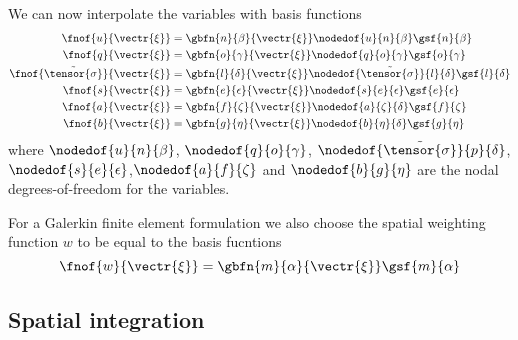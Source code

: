 We can now interpolate the variables with basis functions \ie
\begin{equation}
  \begin{split}
    \fnof{u}{\vectr{\xi}}&=\gbfn{n}{\beta}{\vectr{\xi}}\nodedof{u}{n}{\beta}\gsf{n}{\beta} \\
    \fnof{q}{\vectr{\xi}}&= \gbfn{o}{\gamma}{\vectr{\xi}}\nodedof{q}{o}{\gamma}\gsf{o}{\gamma} \\
    \fnof{\tilde{\tensor{\sigma}}}{\vectr{\xi}}&=
    \gbfn{l}{\delta}{\vectr{\xi}}\nodedof{\tilde{\tensor{\sigma}}}{l}{\delta}\gsf{l}{\delta} \\
    \fnof{s}{\vectr{\xi}}&=\gbfn{e}{\epsilon}{\vectr{\xi}}\nodedof{s}{e}{\epsilon}\gsf{e}{\epsilon} \\
    \fnof{a}{\vectr{\xi}}&=\gbfn{f}{\zeta}{\vectr{\xi}}\nodedof{a}{\zeta}{\delta}\gsf{f}{\zeta} \\
    \fnof{b}{\vectr{\xi}}&=\gbfn{g}{\eta}{\vectr{\xi}}\nodedof{b}{\eta}{\delta}\gsf{g}{\eta}
  \end{split}
\end{equation}
where $\nodedof{u}{n}{\beta}$, $\nodedof{q}{o}{\gamma}$,
$\nodedof{\tilde{\tensor{\sigma}}}{p}{\delta}$,$\nodedof{s}{e}{\epsilon}$,$\nodedof{a}{f}{\zeta}$
and $\nodedof{b}{g}{\eta}$ are the nodal degrees-of-freedom for the variables.

For a Galerkin finite element formulation we also choose the spatial weighting
function $w$ to be equal to the basis fucntions \ie
\begin{equation}
  \fnof{w}{\vectr{\xi}}=\gbfn{m}{\alpha}{\vectr{\xi}}\gsf{m}{\alpha}
\end{equation}

\subsection{Spatial integration}

